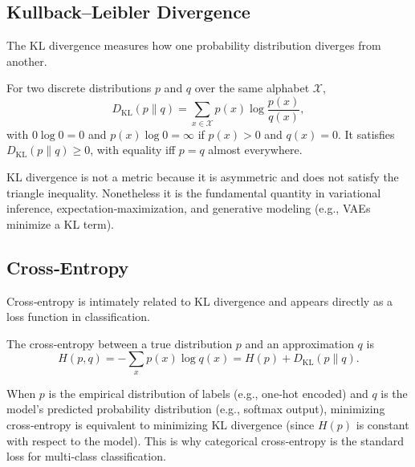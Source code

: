 \documentclass{tufte-handout}
\begin{document}
\subsection{Kullback–Leibler Divergence}

The KL divergence measures how one probability distribution diverges from another.

\begin{defn}
    For two discrete distributions $p$ and $q$ over the same alphabet $\mathcal{X}$,
    \[
    D_{\text{KL}}(p \parallel q) = \sum_{x \in \mathcal{X}} p(x) \log \frac{p(x)}{q(x)},
    \]
    with $0 \log 0 = 0$ and $p(x) \log 0 = \infty$ if $p(x) > 0$ and $q(x)=0$. It satisfies $D_{\text{KL}}(p \parallel q) \ge 0$, with equality iff $p = q$ almost everywhere.
\end{defn}

\begin{remark}
    KL divergence is not a metric because it is asymmetric and does not satisfy the triangle inequality. Nonetheless it is the fundamental quantity in variational inference, expectation‑maximization, and generative modeling (e.g., VAEs minimize a KL term).
\end{remark}

\subsection{Cross‑Entropy}

Cross‑entropy is intimately related to KL divergence and appears directly as a loss function in classification.

\begin{defn}
    The cross‑entropy between a true distribution $p$ and an approximation $q$ is
    \[
    H(p,q) = -\sum_{x} p(x) \log q(x) = H(p) + D_{\text{KL}}(p \parallel q).
    \]
\end{defn}

When $p$ is the empirical distribution of labels (e.g., one‑hot encoded) and $q$ is the model's predicted probability distribution (e.g., softmax output), minimizing cross‑entropy is equivalent to minimizing KL divergence (since $H(p)$ is constant with respect to the model). This is why categorical cross‑entropy is the standard loss for multi‑class classification.

\begin{marginfigure}
\centering
{}
\caption{Cross‑entropy loss for binary classification: $-\log q(y)$ penalizes confident wrong predictions.}
\end{marginfigure}
\end{document}
